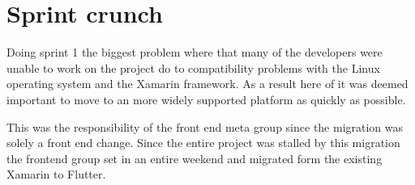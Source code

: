 \section{Sprint crunch}
Doing sprint 1 the biggest problem where that many of the developers were unable to work on the project do to compatibility problems with the Linux operating system and the Xamarin framework. 
As a result here of it was deemed important to move to an more widely supported platform as quickly as possible. 

This was the responsibility of the front end meta group since the migration was solely a front end change. 
Since the entire project was stalled by this migration the frontend group set in an entire weekend and migrated form the existing Xamarin to Flutter.
